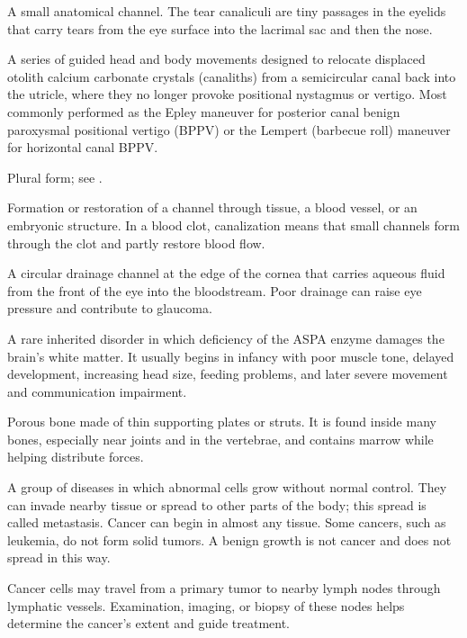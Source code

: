  A small anatomical channel. The tear canaliculi are tiny passages in the eyelids that carry tears from the eye surface into the lacrimal sac and then the nose.

 A series of guided head and body movements designed to relocate displaced otolith calcium carbonate crystals (canaliths) from a semicircular canal back into the utricle, where they no longer provoke positional nystagmus or vertigo. Most commonly performed as the Epley maneuver for posterior canal benign paroxysmal positional vertigo (BPPV) or the Lempert (barbecue roll) maneuver for horizontal canal BPPV.

 Plural form; see .

 Formation or restoration of a channel through tissue, a blood vessel, or an embryonic structure. In a blood clot, canalization means that small channels form through the clot and partly restore blood flow.

 A circular drainage channel at the edge of the cornea that carries aqueous fluid from the front of the eye into the bloodstream. Poor drainage can raise eye pressure and contribute to glaucoma.

 A rare inherited disorder in which deficiency of the ASPA enzyme damages the brain's white matter. It usually begins in infancy with poor muscle tone, delayed development, increasing head size, feeding problems, and later severe movement and communication impairment.

 Porous bone made of thin supporting plates or struts. It is found inside many bones, especially near joints and in the vertebrae, and contains marrow while helping distribute forces.

 A group of diseases in which abnormal cells grow without normal control. They can invade nearby tissue or spread to other parts of the body; this spread is called metastasis. Cancer can begin in almost any tissue. Some cancers, such as leukemia, do not form solid tumors. A benign growth is not cancer and does not spread in this way.


 Cancer cells may travel from a primary tumor to nearby lymph nodes through lymphatic vessels. Examination, imaging, or biopsy of these nodes helps determine the cancer's extent and guide treatment.

